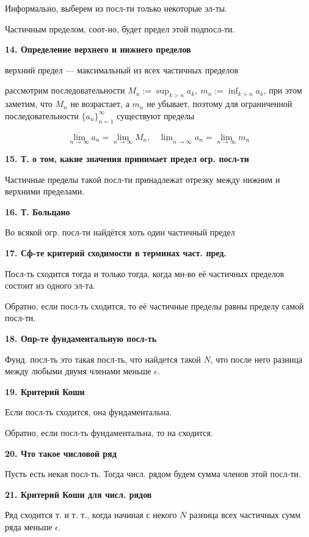 	Информально, выберем из посл-ти только некоторые эл-ты.
	
	Частичным пределом, соот-но, будет предел этой подпосл-ти.
	
	\textbf{14. Определение верхнего и нижнего пределов}
	
	верхний предел --- максимальный из всех частичных пределов
	
	рассмотрим последовательности $M_n := \displaystyle\sup_{k > n}a_k, \ m_n := \displaystyle\inf_{k > n}a_k$, при этом заметим, что $M_n$ не возрастает, а $m_n$ не убывает, поэтому для ограниченной последовательности $ \textstyle\{a_n\}_{n=1}^{\infty}$ существуют пределы
	
	\[\overline{\lim_{n \rightarrow \infty}}a_n = \lim_{n \rightarrow \infty}M_n,  \ \ \ \ \underline{\lim}_{n \rightarrow \infty}a_n = \lim_{n \rightarrow \infty} m_n\]
	
	\textbf{15. Т. о том, какие значения принимает предел огр. посл-ти}
	
	Частичные пределы такой посл-ти принадлежат отрезку между нижним и верхними пределами.
	
	\textbf{16. Т. Больцано}
	
	Во всякой огр. посл-ти найдётся хоть один частичный предел
	
	\textbf{17. Сф-те критерий сходимости в терминах част. пред.}
	
	Посл-ть сходится тогда и только тогда, когда мн-во её частичных пределов состоит из одного эл-та.
	
	Обратно, если посл-ть сходится, то её частичные пределы равны пределу самой посл-ти. 
	
	\textbf{18. Опр-те фундаментальную посл-ть}
	
	Фунд. посл-ть это такая посл-ть, что найдется такой $N$, что после него разница между любыми двумя членами меньше $\epsilon$.
	
	\textbf{19.  Критерий Коши}
	
	Если посл-ть сходится, она фундаментальна.
	
	Обратно, если посл-ть фундаментальна, то на сходится. 
	
	\textbf{20. Что такое числовой ряд}
	
	Пусть есть некая посл-ть. Тогда числ. рядом будем сумма членов этой посл-ти.
	
	\textbf{21. Критерий Коши для числ. рядов}
	
	Ряд сходится т. и т. т., когда начиная с некого $N$ разница  всех частичных сумм ряда меньше $\epsilon$.
	
